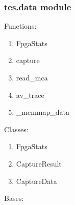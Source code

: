 \documentclass[letterpaper,10pt,english]{sphinxmanual}
\begin{document}
\subsubsection{tes.data module}
\label{\detokenize{tes:module-tes.data}}\label{\detokenize{tes:tes-data-module}}
\sphinxAtStartPar
Functions:
\begin{enumerate}
%
\item {} 
\sphinxAtStartPar
FpgaStats

\item {} 
\sphinxAtStartPar
capture

\item {} 
\sphinxAtStartPar
read\_mca

\item {} 
\sphinxAtStartPar
av\_trace

\item {} 
\sphinxAtStartPar
\_memmap\_data

\end{enumerate}

\sphinxAtStartPar
Classes:
\begin{enumerate}
%
\item {} 
\sphinxAtStartPar
FpgaStats

\item {} 
\sphinxAtStartPar
CaptureResult

\item {} 
\sphinxAtStartPar
CaptureData

\end{enumerate}

\begin{fulllineitems}
\label{\detokenize{tes:tes.data.CaptureData}}
\sphinxAtStartPar
Bases: 

\begin{fulllineitems}
\label{\detokenize{tes:tes.data.CaptureData.homogeneous}}
\end{fulllineitems}


\begin{fulllineitems}
\label{\detokenize{tes:tes.data.CaptureData.mask}}
\end{fulllineitems}


\end{fulllineitems}
\end{document}
